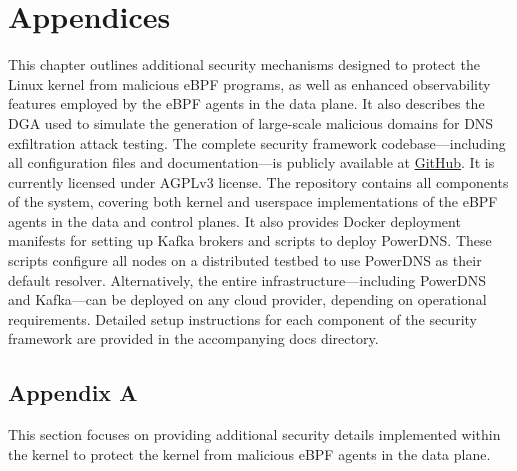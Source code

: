 \documentclass [11pt, proquest] {uwthesis}[2020/02/24]
\begin{document}
 





\chapter{Appendices}

This chapter outlines additional security mechanisms designed to protect the Linux kernel from malicious eBPF programs, as well as enhanced observability features employed by the eBPF agents in the data plane. It also describes the DGA used to simulate the generation of large-scale malicious domains for DNS exfiltration attack testing.
The complete security framework codebase—including all configuration files and documentation—is publicly available at \href{https://github.com/Synarcs/DNSObelisk}{GitHub}. It is currently licensed under AGPLv3 license.
The repository contains all components of the system, covering both kernel and userspace implementations of the eBPF agents in the data and control planes. It also provides Docker deployment manifests for setting up Kafka brokers and scripts to deploy PowerDNS. These scripts configure all nodes on a distributed testbed to use PowerDNS as their default resolver. Alternatively, the entire infrastructure—including PowerDNS and Kafka—can be deployed on any cloud provider, depending on operational requirements.
Detailed setup instructions for each component of the security framework are provided in the accompanying docs directory.

\section{Appendix A}
This section focuses on providing additional security details implemented within the kernel to protect the kernel from malicious eBPF agents in the data plane.
\end{document}
